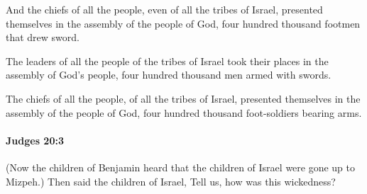 			\begin{versebox}
					\item[BHS] 
					\item[ASV] And the chiefs of all the people, even of all the tribes of Israel, presented themselves in the assembly of the people of God, four hundred thousand footmen that drew sword.
					\item[NIV] The leaders of all the people of the tribes of Israel took their places in the assembly of God’s people, four hundred thousand men armed with swords.
					\item[NRSV] The chiefs of all the people, of all the tribes of Israel, presented themselves in the assembly of the people of God, four hundred thousand foot-soldiers bearing arms.
			\end{versebox}

		\paragraph{Judges 20:3} %
			\label{JUDGES-20-3}

			(Now the children of Benjamin heard that the children of Israel were gone up to Mizpeh.) Then said the children of Israel, Tell us, how was this wickedness?

